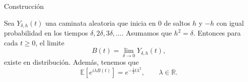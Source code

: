 \begin{frame}{Construcci\'on}
	\begin{Teorema} 
		Sea $Y_{\delta,h}(t)$ una caminata aleatoria que inicia en $0$ 
		de saltos $h$ y $-h$  con igual probabilidad en los tiempos 
		$\delta, 2\delta,3\delta, \ldots $.  
		Asumamos que $h^{2} = \delta$. 
		Entonces para cada $t \geq 0$, el limite
		$$ B(t) = \displaystyle\lim_{\delta \to 0}{Y_{\delta,h}(t)},$$
		existe en distribuci\'on. Adem\'as, tenemos que
		$$
			\mathbb{E}\left[e^{i\lambda B(t)}\right] 
			=e^{- \frac{1}{2}t\lambda^{2}}, \quad \quad \lambda \in 	\mathbb{R}.
		$$
	\end{Teorema}
\end{frame}
